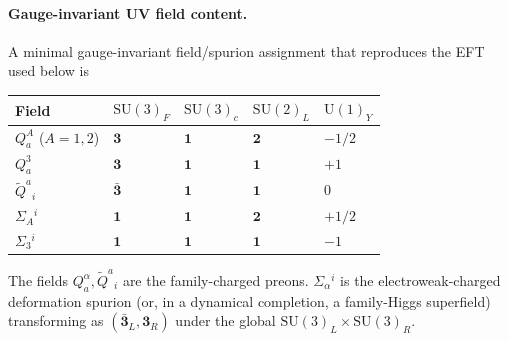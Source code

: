 \documentclass[11pt,a4paper]{article}
\newcommand{\SU}{\mathrm{SU}}
\newcommand{\UU}{\mathrm{U}}
\begin{document}
\paragraph{Gauge-invariant UV field content.}
A minimal gauge-invariant field/spurion assignment that reproduces the EFT used
below is
\begin{center}
\small
\begin{tabular}{@{}lllll@{}}
  \toprule
  Field & $\SU(3)_F$ & $\SU(3)_c$ & $\SU(2)_L$ & $\UU(1)_Y$ \\
  \midrule
  $Q^A_a$ ($A=1,2$) & $\mathbf{3}$ & $\mathbf{1}$ & $\mathbf{2}$ & $-1/2$ \\
  $Q^3_a$ & $\mathbf{3}$ & $\mathbf{1}$ & $\mathbf{1}$ & $+1$ \\
  $\tilde Q^a{}_i$ & $\bar{\mathbf{3}}$ & $\mathbf{1}$ & $\mathbf{1}$ & $0$ \\
  $\Sigma_A{}^i$ & $\mathbf{1}$ & $\mathbf{1}$ & $\mathbf{2}$ & $+1/2$ \\
  $\Sigma_3{}^i$ & $\mathbf{1}$ & $\mathbf{1}$ & $\mathbf{1}$ & $-1$ \\
  \bottomrule
\end{tabular}
\end{center}
The fields $Q^\alpha_a,\tilde Q^a{}_i$ are the family-charged preons.
$\Sigma_\alpha{}^i$ is the electroweak-charged deformation spurion (or,
in a dynamical completion, a family-Higgs superfield) transforming as
$(\bar{\mathbf{3}}_L,\mathbf{3}_R)$ under the global
$\SU(3)_L\times\SU(3)_R$.
\end{document}
